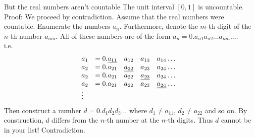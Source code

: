\documentclass{beamer}
\begin{document}
\begin{frame}{But the real numbers aren't countable}
The unit interval $[0, 1]$ is uncountable. \\
Proof:
We proceed by contradiction. Assume that the real numbers were countable.
Enumerate the numbers $a_n$. Furthermore, denote the $m$-th digit of the $n$-th number $a_{nm}.$
All of these numbers are of the form $a_n = 0.a_{n1} a_{n2} \ldots a_{nm} \ldots$.
\\
i.e.
\begin{equation*}
\begin{array}{llllll}
a_{1} &= 0.\emph{a_{11}} &a_{12} &a_{13} &a_{14} \ldots \\
a_{2} &= 0.a_{21} &\emph{a_{22}} &a_{23} &a_{24} \ldots \\
a_{2} &= 0.a_{21} &a_{22} &\emph{a_{23}} &a_{24} \ldots \\
a_{2} &= 0.a_{21} &a_{22} &a_{23} &\emph{a_{24}} \ldots \\
\vdots
\end{array}
\end{equation*}
Then construct a number $d = 0.d_1 d_2 d_3 \ldots$ where $d_1 \ne a_{11}$, $d_2 \ne a_{22}$ and
so on. By construction, $d$ differs from the $n$-th number at the $n$-th digits. Thus $d$ cannot be in your
list! Contradiction.
\end{frame}

\end{document}
